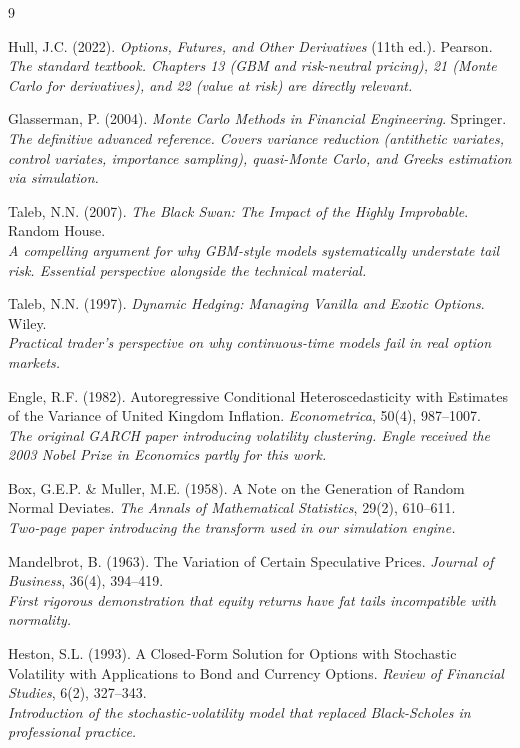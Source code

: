 \documentclass[11pt, a4paper]{article}
\begin{document}
\begin{thebibliography}{9}

  Hull, J.C. (2022).
  \emph{Options, Futures, and Other Derivatives} (11th ed.).
  Pearson.
  \\
  \textit{The standard textbook. Chapters 13 (GBM and risk-neutral pricing), 21 (Monte Carlo for derivatives), and 22 (value at risk) are directly relevant.}

  Glasserman, P. (2004).
  \emph{Monte Carlo Methods in Financial Engineering}.
  Springer.
  \\
  \textit{The definitive advanced reference. Covers variance reduction (antithetic variates, control variates, importance sampling), quasi-Monte Carlo, and Greeks estimation via simulation.}

  Taleb, N.N. (2007).
  \emph{The Black Swan: The Impact of the Highly Improbable}.
  Random House.
  \\
  \textit{A compelling argument for why GBM-style models systematically understate tail risk. Essential perspective alongside the technical material.}

  Taleb, N.N. (1997).
  \emph{Dynamic Hedging: Managing Vanilla and Exotic Options}.
  Wiley.
  \\
  \textit{Practical trader's perspective on why continuous-time models fail in real option markets.}

  Engle, R.F. (1982).
  Autoregressive Conditional Heteroscedasticity with Estimates of the Variance of United Kingdom Inflation.
  \emph{Econometrica}, 50(4), 987--1007.
  \\
  \textit{The original GARCH paper introducing volatility clustering. Engle received the 2003 Nobel Prize in Economics partly for this work.}

  Box, G.E.P. \& Muller, M.E. (1958).
  A Note on the Generation of Random Normal Deviates.
  \emph{The Annals of Mathematical Statistics}, 29(2), 610--611.
  \\
  \textit{Two-page paper introducing the transform used in our simulation engine.}

  Mandelbrot, B. (1963).
  The Variation of Certain Speculative Prices.
  \emph{Journal of Business}, 36(4), 394--419.
  \\
  \textit{First rigorous demonstration that equity returns have fat tails incompatible with normality.}

  Heston, S.L. (1993).
  A Closed-Form Solution for Options with Stochastic Volatility with Applications to Bond and Currency Options.
  \emph{Review of Financial Studies}, 6(2), 327--343.
  \\
  \textit{Introduction of the stochastic-volatility model that replaced Black-Scholes in professional practice.}


\end{thebibliography}
\end{document}
